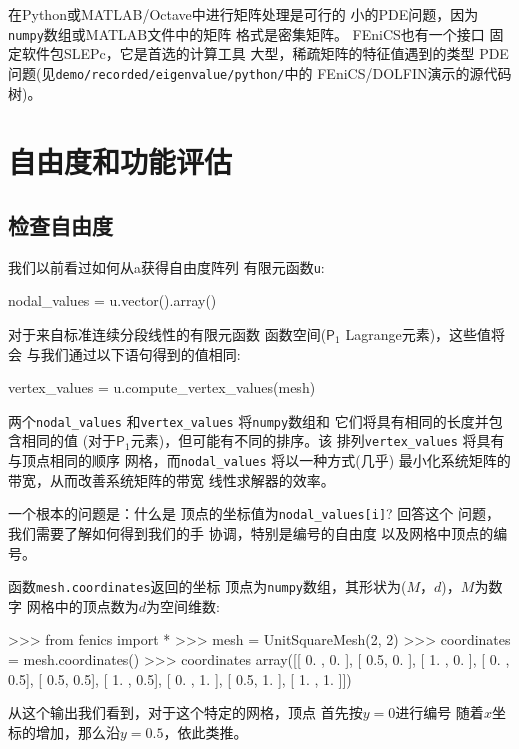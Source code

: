 
在Python或MATLAB/Octave中进行矩阵处理是可行的
小的PDE问题，因为\texttt{numpy}数组或MATLAB文件中的矩阵
格式是密集矩阵。 FEniCS也有一个接口
固定软件包SLEPc，它是首选的计算工具
大型，稀疏矩阵的特征值遇到的类型
PDE问题(见\texttt{demo/recorded/eigenvalue/python/}中的
FEniCS/DOLFIN演示的源代码树)。

\section{自由度和功能评估}

\subsection{检查自由度}
\label{ch:poisson0:verify1}


我们以前看过如何从a获得自由度阵列
有限元函数\texttt{u}:

\begin{python}
nodal_values = u.vector().array()
\end{python}

对于来自标准连续分段线性的有限元函数
函数空间($\mathsf{P} _1$ Lagrange元素)，这些值将会
与我们通过以下语句得到的值相同:

\begin{python}
vertex_values = u.compute_vertex_values(mesh)
\end{python}
两个\verb!nodal_values! 和\verb!vertex_values! 将\texttt{numpy}数组和
它们将具有相同的长度并包含相同的值
(对于$\mathsf{P}_1$元素)，但可能有不同的排序。该
排列\verb!vertex_values! 将具有与顶点相同的顺序
网格，而\verb!nodal_values! 将以一种方式(几乎)
最小化系统矩阵的带宽，从而改善系统矩阵的带宽
线性求解器的效率。

一个根本的问题是：什么是
顶点的坐标值为\verb!nodal_values[i]!? 回答这个
问题，我们需要了解如何得到我们的手
协调，特别是编号的自由度
以及网格中顶点的编号。

函数\texttt{mesh.coordinates}返回的坐标
顶点为\texttt{numpy}数组，其形状为($M，d$)，$M$为数字
网格中的顶点数为$d$为空间维数:

\begin{python}
>>> from fenics import *
>>> mesh = UnitSquareMesh(2, 2)
>>> coordinates = mesh.coordinates()
>>> coordinates
array([[ 0. ,  0. ],
       [ 0.5,  0. ],
       [ 1. ,  0. ],
       [ 0. ,  0.5],
       [ 0.5,  0.5],
       [ 1. ,  0.5],
       [ 0. ,  1. ],
       [ 0.5,  1. ],
       [ 1. ,  1. ]])
\end{python}
从这个输出我们看到，对于这个特定的网格，顶点
首先按$ y=0 $进行编号
随着$x$坐标的增加，那么沿$y=0.5$，依此类推。


